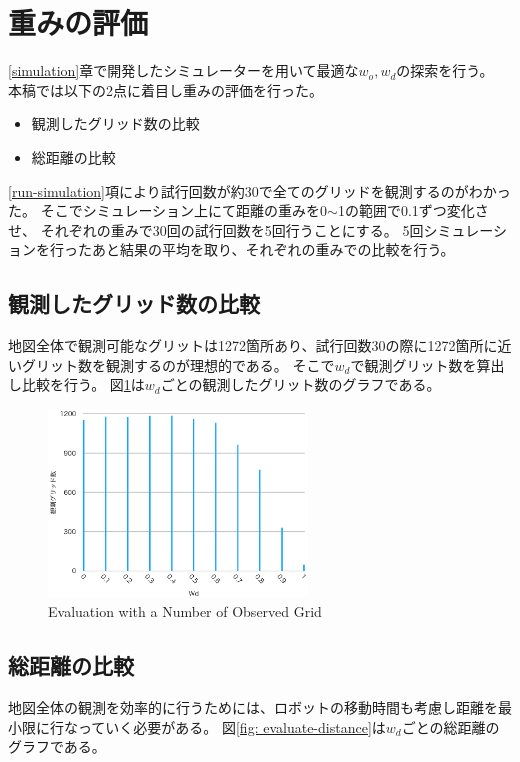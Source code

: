 \documentclass{jsarticle}
\begin{document}
\section{重みの評価}
\label{evaluate-weight}
\ref{simulation}章で開発したシミュレーターを用いて最適な$w_o,w_d$の探索を行う。
本稿では以下の2点に着目し重みの評価を行った。
\begin{itemize}
	\item 観測したグリッド数の比較
	\item 総距離の比較
\end{itemize}
\ref{run-simulation}項により試行回数が約30で全てのグリッドを観測するのがわかった。
そこでシミュレーション上にて距離の重みを0$\sim$1の範囲で0.1ずつ変化させ、
それぞれの重みで30回の試行回数を5回行うことにする。
5回シミュレーションを行ったあと結果の平均を取り、それぞれの重みでの比較を行う。


\subsection{観測したグリッド数の比較}
\label{evaluate-observation}
地図全体で観測可能なグリットは1272箇所あり、試行回数30の際に1272箇所に近いグリット数を観測するのが理想的である。
そこで$w_d$で観測グリット数を算出し比較を行う。
図\ref{fig: evaluate-observation}は$w_d$ごとの観測したグリット数のグラフである。


\begin{figure}[tbh]
 \centering
  \includegraphics[height=50mm]{fig/evaluate-grid.eps}
  \vspace*{-4mm}
  \caption{Evaluation with a Number of Observed Grid}
  \label{fig: evaluate-observation}
\end{figure}


\subsection{総距離の比較}
\label{evaluate-distance}
地図全体の観測を効率的に行うためには、ロボットの移動時間も考慮し距離を最小限に行なっていく必要がある。
図\ref{fig: evaluate-distance}は$w_d$ごとの総距離のグラフである。
\end{document}
